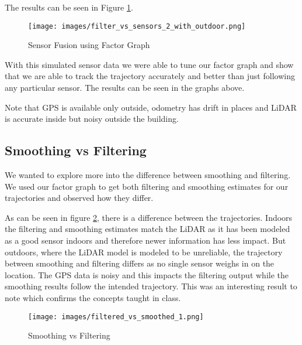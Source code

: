 \documentclass[10pt, reqno, letterpaper, twoside]{amsart}
\begin{document}
The results can be seen in Figure \ref{fig:factor_graph}.
\begin{figure}
    \centering
    \texttt{[image: images/filter\_vs\_sensors\_2\_with\_outdoor.png]}
    \caption{Sensor Fusion using Factor Graph}
    \label{fig:factor_graph}
\end{figure}

With this simulated sensor data we were able to tune our factor graph and show that we are able to track the trajectory accurately and better than just following any particular sensor. The results can be seen in the graphs above.

Note that GPS is available only outside, odometry has drift in places and LiDAR is accurate inside but noisy outside the building.

\subsection{Smoothing vs Filtering}
We wanted to explore more into the difference between smoothing and filtering. We used our factor graph to get both filtering and smoothing estimates for our trajectories and observed how they differ.

As can be seen in figure \ref{fig:smoothing_vs_filtering}, there is a difference between the trajectories. Indoors the filtering and smoothing estimates match the LiDAR as it has been modeled as a good sensor indoors and therefore newer information has less impact. 
But outdoors, where the LiDAR model is modeled to be unreliable, the trajectory between smoothing and filtering differs as no single sensor weighs in on the location. The GPS data is noisy and this impacts the filtering  output while the smoothing results follow the intended trajectory.
This was an interesting result to note which confirms the concepts taught in class.

\begin{figure}
    \centering
    \texttt{[image: images/filtered\_vs\_smoothed\_1.png]}
    \caption{Smoothing vs Filtering}
    \label{fig:smoothing_vs_filtering}
\end{figure}
\end{document}

